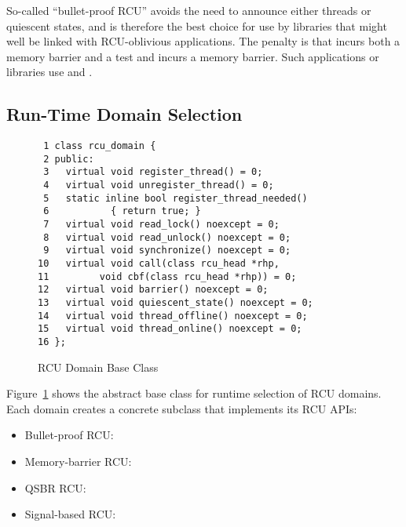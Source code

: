 \documentclass[letterpaper,10pt]{article}
\begin{document}
So-called ``bullet-proof RCU'' avoids the need to announce either threads
or quiescent states, and is therefore the best choice for use by
libraries that might well be linked with RCU-oblivious applications.
The penalty is that  incurs both a memory barrier
and a test and  incurs a memory barrier.
Such applications or libraries use  and
.

\subsection{Run-Time Domain Selection}
\label{sec:Run-Time Domain Selection}

\begin{figure}[tbp]
{ \scriptsize
\begin{verbatim}
 1 class rcu_domain {
 2 public:
 3   virtual void register_thread() = 0;
 4   virtual void unregister_thread() = 0;
 5   static inline bool register_thread_needed()
 6           { return true; }
 7   virtual void read_lock() noexcept = 0;
 8   virtual void read_unlock() noexcept = 0;
 9   virtual void synchronize() noexcept = 0;
10   virtual void call(class rcu_head *rhp,
11         void cbf(class rcu_head *rhp)) = 0;
12   virtual void barrier() noexcept = 0;
13   virtual void quiescent_state() noexcept = 0;
14   virtual void thread_offline() noexcept = 0;
15   virtual void thread_online() noexcept = 0;
16 };
\end{verbatim}
}
\caption{RCU Domain Base Class}
\label{fig:RCU Domain Base Class}
\end{figure}

Figure~\ref{fig:RCU Domain Base Class}
shows the abstract base class for runtime selection of RCU domains.
Each domain creates a concrete subclass that implements its RCU APIs:

\begin{itemize}
\item	Bullet-proof RCU: 
\item	Memory-barrier RCU: 
\item	QSBR RCU: 
\item	Signal-based RCU: 
\end{itemize}

\end{document}
